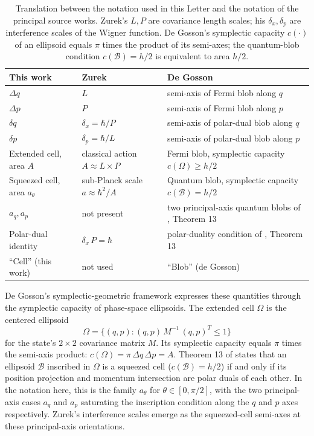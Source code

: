 \documentclass[%
  aps, amsmath, amssymb, onecolumn, 11pt
]{revtex4-2}
\begin{document}
\begin{table}[h]
\centering
\begin{tabular}{@{}lll@{}}
\toprule
This work & Zurek \cite{zurek2001} & De Gosson \cite{degossoncharlyne2022, degosson2013qblobs, degosson2013fermiblobs} \\
\midrule
$\Delta q$ & $L$ & semi-axis of Fermi blob along $q$ \\
$\Delta p$ & $P$ & semi-axis of Fermi blob along $p$ \\
$\delta q$ & $\delta_x = \hbar/P$ & semi-axis of polar-dual blob along $q$ \\
$\delta p$ & $\delta_p = \hbar/L$ & semi-axis of polar-dual blob along $p$ \\
Extended cell, area $A$ & classical action $A \approx L \times P$ & Fermi blob, symplectic capacity $c(\Omega) \geq h/2$ \\
Squeezed cell, area $a_\theta$ & sub-Planck scale $a \approx \hbar^2/A$ & Quantum blob, symplectic capacity $c(\mathcal{B}) = h/2$ \\
$a_q, a_p$ & not present & two principal-axis quantum blobs of \cite{degossoncharlyne2022}, Theorem 13 \\
Polar-dual identity & $\delta_x \, P = \hbar$ & polar-duality condition of \cite{degossoncharlyne2022}, Theorem 13 \\
``Cell'' (this work) & not used & ``Blob'' (de Gosson) \\
\bottomrule
\end{tabular}
\caption{Translation between the notation used in this Letter and the notation of the principal source works. Zurek's $L, P$ are covariance length scales; his $\delta_x, \delta_p$ are interference scales of the Wigner function. De Gosson's symplectic capacity $c(\cdot)$ of an ellipsoid equals $\pi$ times the product of its semi-axes; the quantum-blob condition $c(\mathcal{B}) = h/2$ is equivalent to area $h/2$.}
\label{tab:notation}
\end{table}

De Gosson's symplectic-geometric framework expresses these quantities through the symplectic capacity of phase-space ellipsoids. The extended cell $\Omega$ is the centered ellipsoid
\begin{equation}
\Omega = \{(q,p) : (q,p) \, M^{-1} \, (q,p)^T \leq 1\}
\label{eq:extended_ellipsoid}
\end{equation}
for the state's $2 \times 2$ covariance matrix $M$. Its symplectic capacity equals $\pi$ times the semi-axis product: $c(\Omega) = \pi \, \Delta q \, \Delta p = A$. Theorem 13 of \cite{degossoncharlyne2022} states that an ellipsoid $\mathcal{B}$ inscribed in $\Omega$ is a squeezed cell ($c(\mathcal{B}) = h/2$) if and only if its position projection and momentum intersection are polar duals of each other. In the notation here, this is the family $a_\theta$ for $\theta \in [0, \pi/2]$, with the two principal-axis cases $a_q$ and $a_p$ saturating the inscription condition along the $q$ and $p$ axes respectively. Zurek's interference scales emerge as the squeezed-cell semi-axes at these principal-axis orientations.
\end{document}
